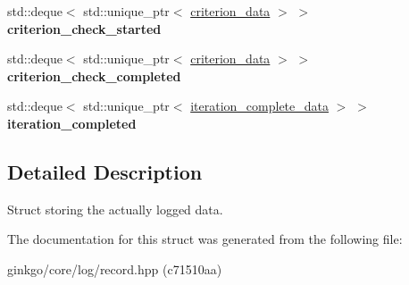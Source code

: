\begin{DoxyCompactItemize}
\item 
\mbox{\label{structgko_1_1log_1_1Record_1_1logged__data_abfe68110796c0a094c937d3a8787cc04}} 
std\+::deque$<$ std\+::unique\+\_\+ptr$<$ \hyperlink{structgko_1_1log_1_1criterion__data}{criterion\+\_\+data} $>$ $>$ {\bfseries criterion\+\_\+check\+\_\+started}
\item 
\mbox{\label{structgko_1_1log_1_1Record_1_1logged__data_abf13cae8d7e797ae6c2b4ddf9a9cb33a}} 
std\+::deque$<$ std\+::unique\+\_\+ptr$<$ \hyperlink{structgko_1_1log_1_1criterion__data}{criterion\+\_\+data} $>$ $>$ {\bfseries criterion\+\_\+check\+\_\+completed}
\item 
\mbox{\label{structgko_1_1log_1_1Record_1_1logged__data_a54f71b0aecebe7a7957eb5cfba7395e3}} 
std\+::deque$<$ std\+::unique\+\_\+ptr$<$ \hyperlink{structgko_1_1log_1_1iteration__complete__data}{iteration\+\_\+complete\+\_\+data} $>$ $>$ {\bfseries iteration\+\_\+completed}
\end{DoxyCompactItemize}


\subsection{Detailed Description}
Struct storing the actually logged data. 

The documentation for this struct was generated from the following file\+:\begin{DoxyCompactItemize}
\item 
ginkgo/core/log/record.\+hpp (c71510aa)\end{DoxyCompactItemize}
